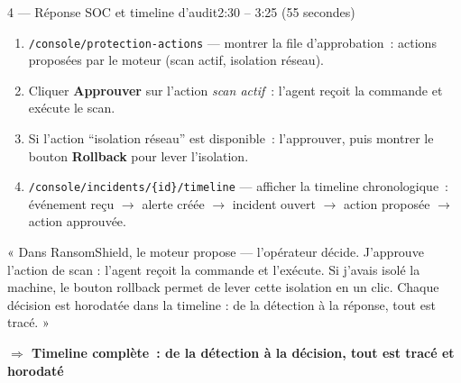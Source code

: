 \documentclass[a4paper,11pt]{article}
\newcommand{\clic}[1]{\texttt{\small #1}}
\newcommand{\resultat}[1]{\textbf{\textcolor{ifriblue}{$\Rightarrow$ #1}}}
\begin{document}
\begin{etapebox}{4 --- Réponse SOC et timeline d'audit}{2:30 -- 3:25 \textnormal{(55 secondes)}}

\begin{montrerbox}
\begin{enumerate}[leftmargin=1.5em,itemsep=3pt]
  \item \clic{/console/protection-actions} --- montrer la file d'approbation~:
    actions proposées par le moteur (scan actif, isolation réseau).
  \item Cliquer \textbf{Approuver} sur l'action \textit{scan actif}~: l'agent reçoit la commande et exécute le scan.
  \item Si l'action ``isolation réseau'' est disponible~: l'approuver, puis montrer
    le bouton \textbf{Rollback} pour lever l'isolation.
  \item \clic{/console/incidents/\{id\}/timeline} --- afficher la timeline chronologique~:
    événement reçu $\to$ alerte créée $\to$ incident ouvert $\to$ action proposée $\to$ action approuvée.
\end{enumerate}
\end{montrerbox}

\vspace{5pt}

\begin{direbox}
« Dans RansomShield, le moteur propose — l'opérateur décide.
J'approuve l'action de scan : l'agent reçoit la commande et l'exécute.
Si j'avais isolé la machine, le bouton rollback permet de lever cette isolation en un clic.
Chaque décision est horodatée dans la timeline : de la détection à la réponse, tout est tracé. »
\end{direbox}

\resultat{Timeline complète~: de la détection à la décision, tout est tracé et horodaté}

\end{etapebox}

\vspace{6pt}
\end{document}
